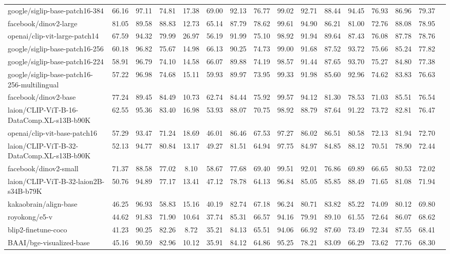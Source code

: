 \begin{table*}
{\begin{tabular}{lccccccccccccccc}
google/siglip-base-patch16-384 &66.16 &97.11 &74.81 &17.38 &69.00 &92.13 &76.77 &99.02 &92.71 &88.44 &94.45 &76.93 &86.96 &79.37 \\
facebook/dinov2-large &81.05 &89.58 &88.83 &12.73 &65.14 &87.79 &78.62 &99.61 &94.90 &86.21 &81.00 &72.76 &88.08 &78.95 \\
openai/clip-vit-large-patch14 &67.59 &94.32 &79.99 &26.97 &56.19 &91.99 &75.10 &98.92 &91.94 &89.64 &87.43 &76.08 &87.78 &78.76 \\
google/siglip-base-patch16-256 &60.18 &96.82 &75.67 &14.98 &66.13 &90.25 &74.73 &99.00 &91.68 &87.52 &93.72 &75.66 &85.24 &77.82 \\
google/siglip-base-patch16-224 &58.91 &96.79 &74.10 &14.58 &66.07 &89.88 &74.19 &98.57 &91.44 &87.65 &93.70 &75.27 &84.80 &77.38 \\
google/siglip-base-patch16-256-multilingual &57.22 &96.98 &74.68 &15.11 &59.93 &89.97 &73.95 &99.33 &91.98 &85.60 &92.96 &74.62 &83.83 &76.63 \\
facebook/dinov2-base &77.24 &89.45 &84.49 &10.73 &62.74 &84.44 &75.92 &99.57 &94.12 &81.30 &78.53 &71.03 &85.51 &76.54 \\
laion/CLIP-ViT-B-16-DataComp.XL-s13B-b90K &62.55 &95.36 &83.40 &16.98 &53.93 &88.07 &70.75 &98.92 &88.79 &87.64 &91.22 &73.72 &82.81 &76.47 \\
openai/clip-vit-base-patch16 &57.29 &93.47 &71.24 &18.69 &46.01 &86.46 &67.53 &97.27 &86.02 &86.51 &80.58 &72.13 &81.94 &72.70 \\
laion/CLIP-ViT-B-32-DataComp.XL-s13B-b90K &52.13 &94.77 &80.84 &13.17 &49.27 &81.51 &64.94 &97.75 &84.97 &84.85 &88.12 &70.51 &78.90 &72.44 \\
facebook/dinov2-small &71.37 &88.58 &77.02 &8.10 &58.67 &77.68 &69.40 &99.51 &92.01 &76.86 &69.89 &66.65 &80.53 &72.02 \\
laion/CLIP-ViT-B-32-laion2B-s34B-b79K &50.76 &94.89 &77.17 &13.41 &47.12 &78.78 &64.13 &96.84 &85.05 &85.85 &88.49 &71.65 &81.08 &71.94 \\
kakaobrain/align-base &46.25 &96.93 &58.83 &15.16 &40.19 &82.74 &67.18 &96.24 &80.71 &83.82 &85.22 &74.09 &80.12 &69.80 \\
royokong/e5-v &44.62 &91.83 &71.90 &10.64 &37.74 &85.31 &66.57 &94.16 &79.91 &89.10 &61.55 &72.64 &86.07 &68.62 \\
blip2-finetune-coco &41.23 &90.25 &82.26 &8.72 &35.21 &84.13 &65.51 &94.06 &66.92 &87.60 &73.49 &72.34 &87.55 &68.41 \\
BAAI/bge-visualized-base &45.16 &90.59 &82.96 &10.12 &35.91 &84.12 &64.86 &95.25 &78.21 &83.09 &66.29 &73.62 &77.76 &68.30 \\

\end{tabular}}
\end{table*}
